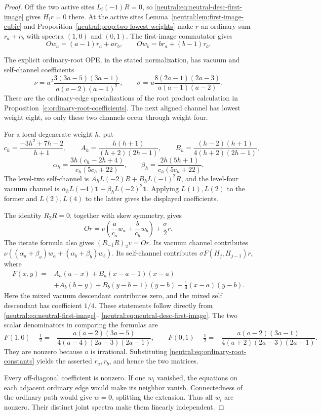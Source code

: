 \documentclass[11pt,a4paper]{article}
\numberwithin{equation}{section}
\theoremstyle{definition}\newtheorem{definition}[theorem]{Definition}
\theoremstyle{remark}\newtheorem{remark}[theorem]{Remark}
\begin{document}
\begin{proof}
Off the two active sites $L_i(-1)R=0$, so
\eqref{neutral:eq:neutral-desc-first-image} gives $H_ir=0$ there.
At the active sites Lemma~\ref{neutral:lem:first-image-cubic} and
Proposition~\ref{neutral:prop:two-lowest-weights} make $r$ an ordinary
sum $r_a+r_b$ with spectra $(1,0)$ and $(0,1)$.  The first-image
commutator gives
\[
 Ow_a=(a-1)r_a+ar_b,\qquad
 Ow_b=br_a+(b-1)r_b.
\]

The explicit ordinary-root OPE, in the stated normalization, has
vacuum and self-channel coefficients
\begin{equation}\label{neutral:eq:ordinary-root-constants}
 \nu=u^2\frac{3(3a-5)(3a-1)}{a(a-2)(a-1)^2},\qquad
 \sigma=u\frac{8(2a-1)(2a-3)}{a(a-1)(a-2)}.
\end{equation}
These are the ordinary-edge specializations of the root product
calculation in Proposition~\ref{c:ordinary-root-coefficients}.
The next aligned channel has lowest weight eight, so only these
two channels occur through weight four.

For a local degenerate weight $h$, put
\[
 c_h=\frac{-3h^2+7h-2}{h+1},\qquad
 A_h=\frac{h(h+1)}{(h+2)(2h-1)},\qquad
 B_h=\frac{(h-2)(h+1)}{4(h+2)(2h-1)},
\]
\[
 \alpha_h=\frac{3h(c_h-2h+4)}{c_h(5c_h+22)},\qquad
 \beta_h=\frac{2h(5h+1)}{c_h(5c_h+22)}.
\]
The level-two self-channel is
$A_hL(-2)R+B_hL(-1)^2R$, and the level-four vacuum channel is
$\alpha_hL(-4)\mathbf1+\beta_hL(-2)^2\mathbf1$.
Applying $L(1),L(2)$ to the former and $L(2),L(4)$ to the latter
gives the displayed coefficients.

The identity $R_2R=0$, together with skew symmetry, gives
\[
 Or=\nu\left(\frac a{c_a}w_a+\frac b{c_b}w_b\right)
                        +\frac\sigma2r.
\]
The iterate formula also gives $(R_{-1}R)_2v=Or$.  Its vacuum
channel contributes
$\nu((\alpha_a+\beta_a)w_a+(\alpha_b+\beta_b)w_b)$.
Its self-channel contributes $\sigma F(H_j,H_{j-1})r$, where
\begin{align*}
 F(x,y)={}&A_a(a-x)+B_a(x-a-1)(x-a)\\
         &+A_b(b-y)+B_b(y-b-1)(y-b)
                         +\tfrac14(x-a)(y-b).
\end{align*}
Here the mixed vacuum descendant contributes zero, and the mixed
self descendant has coefficient $1/4$.  These statements follow
directly from \eqref{neutral:eq:neutral-first-image}--
\eqref{neutral:eq:neutral-desc-first-image}.
The two scalar denominators in comparing the formulas are
\[
 F(1,0)-\tfrac12
 =-\frac{a(a-2)(3a-5)}{4(a-4)(2a-3)(2a-1)},\qquad
 F(0,1)-\tfrac12
 =-\frac{a(a-2)(3a-1)}{4(a+2)(2a-3)(2a-1)}.
\]
They are nonzero because $a$ is irrational.  Substituting
\eqref{neutral:eq:ordinary-root-constants} yields the asserted
$r_a,r_b$, and hence the two matrices.

Every off-diagonal coefficient is nonzero.  If one $w_i$ vanished,
the equations on each adjacent ordinary edge would make its neighbor
vanish.  Connectedness of the ordinary path would give $w=0$,
splitting the extension.  Thus all $w_i$ are nonzero.  Their distinct
joint spectra make them linearly independent.
\end{proof}
\end{document}
